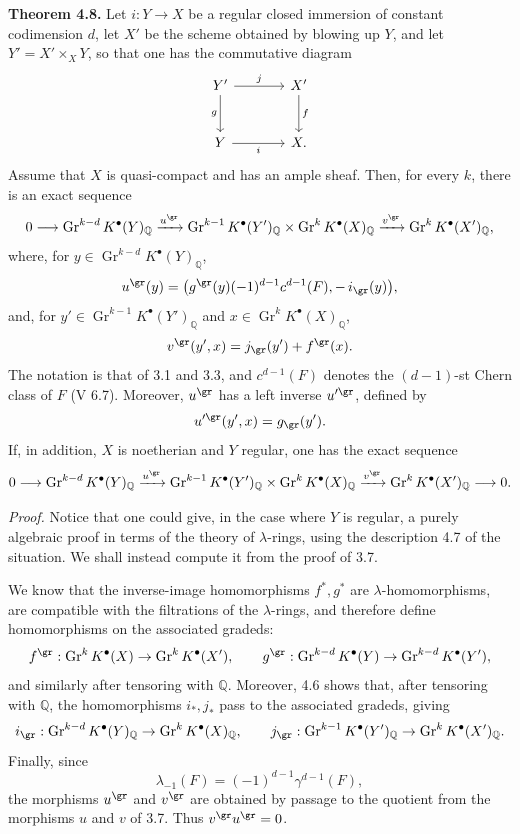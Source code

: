 \textbf{Theorem 4.8.} Let \(i:Y\to X\) be a regular closed immersion of constant codimension \(d\), let \(X'\) be the scheme obtained by blowing up \(Y\), and let \(Y'=X'\times_XY\), so that one has the commutative diagram
\[
\begin{tikzcd}[column sep=large,row sep=large]
Y' \arrow[r,"j"] \arrow[d,"g"'] & X' \arrow[d,"f"]\\
Y \arrow[r,"i"'] & X.
\end{tikzcd}
\]
Assume that \(X\) is quasi-compact and has an ample sheaf. Then, for every \(k\), there is an exact sequence
\[
0\longrightarrow
\operatorname{Gr}^{k-d}K^\bullet(Y)_{\mathbb Q}
\xrightarrow{u^{\gr}}
\operatorname{Gr}^{k-1}K^\bullet(Y')_{\mathbb Q}
\times
\operatorname{Gr}^{k}K^\bullet(X)_{\mathbb Q}
\xrightarrow{v^{\gr}}
\operatorname{Gr}^{k}K^\bullet(X')_{\mathbb Q},
\]
where, for \(y\in \operatorname{Gr}^{k-d}K^\bullet(Y)_{\mathbb Q}\),
\[
  u^{\gr}(y)=
  \bigl(g^{\gr}(y)(-1)^{d-1}c^{d-1}(F),-\,i_{\gr}(y)\bigr),
\]
and, for \(y'\in \operatorname{Gr}^{k-1}K^\bullet(Y')_{\mathbb Q}\) and \(x\in \operatorname{Gr}^{k}K^\bullet(X)_{\mathbb Q}\),
\[
  v^{\gr}(y',x)=j_{\gr}(y')+f^{\gr}(x).
\]
The notation is that of 3.1 and 3.3, and \(c^{d-1}(F)\) denotes the \((d-1)\)-st Chern class of \(F\) (V 6.7). Moreover, \(u^{\gr}\) has a left inverse \(u'^{\gr}\), defined by
\[
  u'^{\gr}(y',x)=g_{\gr}(y').
\]
If, in addition, \(X\) is noetherian and \(Y\) regular, one has the exact sequence
\[
0\longrightarrow
\operatorname{Gr}^{k-d}K^\bullet(Y)_{\mathbb Q}
\xrightarrow{u^{\gr}}
\operatorname{Gr}^{k-1}K^\bullet(Y')_{\mathbb Q}
\times
\operatorname{Gr}^{k}K^\bullet(X)_{\mathbb Q}
\xrightarrow{v^{\gr}}
\operatorname{Gr}^{k}K^\bullet(X')_{\mathbb Q}
\longrightarrow0.
\]

\emph{Proof.} Notice that one could give, in the case where \(Y\) is regular, a purely algebraic proof in terms of the theory of \(\lambda\)-rings, using the description 4.7 of the situation. We shall instead compute it from the proof of 3.7.

We know that the inverse-image homomorphisms \(f^*,g^*\) are \(\lambda\)-homomorphisms, are compatible with the filtrations of the \(\lambda\)-rings, and therefore define homomorphisms on the associated gradeds:
\[
  f^{\gr}:\operatorname{Gr}^kK^\bullet(X)\to\operatorname{Gr}^kK^\bullet(X'),
  \qquad
  g^{\gr}:\operatorname{Gr}^{k-d}K^\bullet(Y)\to\operatorname{Gr}^{k-d}K^\bullet(Y'),
\]
and similarly after tensoring with \(\mathbb Q\). Moreover, 4.6 shows that, after tensoring with \(\mathbb Q\), the homomorphisms \(i_*,j_*\) pass to the associated gradeds, giving
\[
  i_{\gr}:\operatorname{Gr}^{k-d}K^\bullet(Y)_{\mathbb Q}
  \to \operatorname{Gr}^{k}K^\bullet(X)_{\mathbb Q},
  \qquad
  j_{\gr}:\operatorname{Gr}^{k-1}K^\bullet(Y')_{\mathbb Q}
  \to \operatorname{Gr}^{k}K^\bullet(X')_{\mathbb Q}.
\]
Finally, since
\[
  \lambda_{-1}(F)=(-1)^{d-1}\gamma^{d-1}(F),
\]
the morphisms \(u^{\gr}\) and \(v^{\gr}\) are obtained by passage to the quotient from the morphisms \(u\) and \(v\) of 3.7. Thus \(v^{\gr}u^{\gr}=0\).

